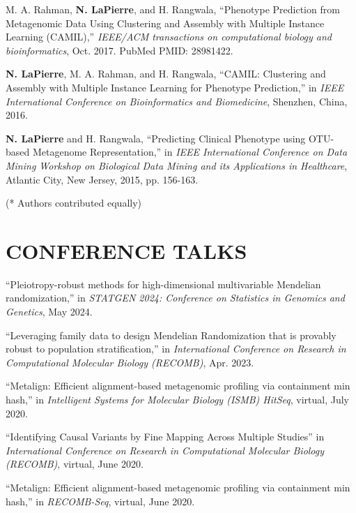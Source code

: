 \documentclass[margin, 10pt]{res} %
\begin{document}
\begin{resume}
M. A. Rahman, \textbf{N. LaPierre}, and H. Rangwala, ``Phenotype Prediction from Metagenomic Data Using Clustering and Assembly with Multiple Instance Learning (CAMIL),'' \emph{IEEE/ACM transactions on computational biology and bioinformatics}, Oct. 2017. PubMed PMID: 28981422.

\textbf{N. LaPierre}, M. A. Rahman, and H. Rangwala, ``CAMIL: Clustering and Assembly with Multiple Instance Learning for Phenotype Prediction,'' in {\sl IEEE International Conference on Bioinformatics and Biomedicine}, Shenzhen, China, 2016.

\textbf{N. LaPierre} and H. Rangwala, ``Predicting Clinical Phenotype using OTU-based Metagenome Representation,'' in {\sl IEEE International Conference on Data Mining Workshop on Biological Data Mining and its Applications in Healthcare}, Atlantic City, New Jersey, 2015, pp. 156-163.

(*  Authors contributed equally)




\section{CONFERENCE TALKS}

``Pleiotropy-robust methods for high-dimensional multivariable Mendelian randomization,'' in {\sl STATGEN 2024: Conference on Statistics in Genomics and Genetics}, May 2024.

``Leveraging family data to design Mendelian Randomization that is provably robust to population stratification,'' in {\sl International Conference on Research in Computational Molecular Biology (RECOMB)}, Apr. 2023.

``Metalign: Efficient alignment-based metagenomic profiling via containment min hash,'' in {\sl Intelligent Systems for Molecular Biology (ISMB) HitSeq}, virtual, July 2020.

``Identifying Causal Variants by Fine Mapping Across Multiple Studies'' in {\sl International Conference on Research in Computational Molecular Biology (RECOMB)}, virtual, June 2020.

``Metalign: Efficient alignment-based metagenomic profiling via containment min hash,'' in {\sl RECOMB-Seq}, virtual, June 2020.


\end{resume}
\end{document}
